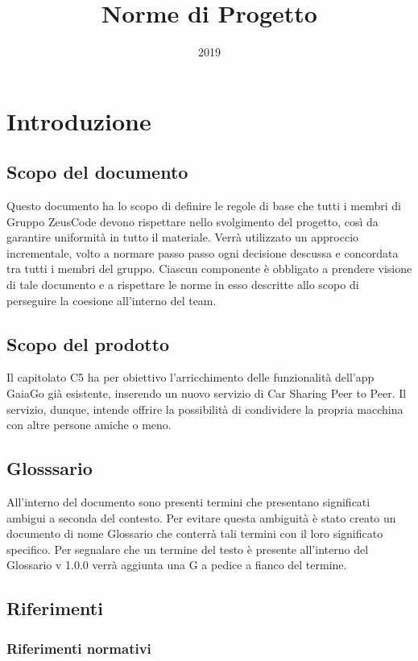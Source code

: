 \documentclass[a4paper]{article}
\title{Norme di Progetto}
\author{\GroupName}
\date{2019}
\newcommand{\GroupName} {Gruppo ZeusCode }
\begin{document}

\maketitle
\newpage
\tableofcontents
\newpage
\section {Introduzione}
\subsection {Scopo del documento}
Questo documento  ha lo scopo di definire le regole di base che tutti i membri di \GroupName devono rispettare nello svolgimento del progetto, così da garantire uniformità in tutto il materiale. Verrà utilizzato un approccio incrementale, volto a normare passo passo ogni decisione descussa e concordata tra tutti i membri del gruppo. Ciascun componente è obbligato a prendere visione di tale documento e a rispettare le norme in esso descritte allo scopo di perseguire la coesione all'interno del team.
\subsection {Scopo del prodotto}
Il capitolato C5 ha per obiettivo l'arricchimento delle funzionalità dell'app GaiaGo già esistente, inserendo un nuovo servizio di Car Sharing Peer to Peer.
Il servizio, dunque, intende offrire la possibilità di condividere la propria macchina con altre persone amiche o meno.
\subsection {Glosssario}
All’interno del documento sono presenti termini che presentano significati ambigui a seconda del contesto.  Per evitare questa ambiguità è stato creato un documento di nome  Glossario  che  conterrà  tali  termini  con  il  loro  significato  specifico.   Per
segnalare  che  un  termine  del  testo  è  presente  all’interno  del
Glossario  v  1.0.0 verrà aggiunta una G a pedice a fianco del termine.
\subsection {Riferimenti}
\subsubsection {Riferimenti normativi}
\end{document}
